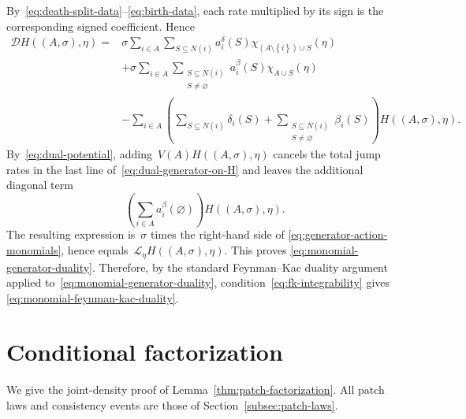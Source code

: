 \documentclass[EJP,preprint,NODS,nobera]{ejpecp}
\newcommand{\bb}[1]{\left(#1\right)}
\newcommand{\cb}[1]{\left\{#1\right\}}
\newcommand{\Lcal}{\mathcal{L}}
\newcommand{\Dcal}{\mathcal{D}}
\begin{document}
By~\eqref{eq:death-split-data}--\eqref{eq:birth-data}, each rate multiplied by
its sign is the corresponding signed coefficient. Hence
\begin{equation}
\label{eq:dual-generator-on-H}
\begin{aligned}
\Dcal H((A,\sigma),\eta)
={}&
\sigma
\sum_{i\in A}\sum_{S\subseteq N(i)}
a_i^\delta(S)
\chi_{\bb{A\setminus\cb{i}}\cup S}(\eta)
\\
&+
\sigma
\sum_{i\in A}
\sum_{\substack{S\subseteq N(i)\\S\neq\varnothing}}
a_i^\beta(S)
\chi_{A\cup S}(\eta)
\\
&-
\sum_{i\in A}
\bb{
\sum_{S\subseteq N(i)}\delta_i(S)
+
\sum_{\substack{S\subseteq N(i)\\S\neq\varnothing}}\beta_i(S)
}H((A,\sigma),\eta).
\end{aligned}
\end{equation}
By~\eqref{eq:dual-potential}, adding~$V(A)H((A,\sigma),\eta)$ cancels the
total jump rates in the last line of~\eqref{eq:dual-generator-on-H} and leaves
the additional diagonal term
\begin{equation*}
\bb{\sum_{i\in A}a_i^\beta(\varnothing)}H((A,\sigma),\eta).
\end{equation*}
The resulting expression is~$\sigma$ times the right-hand side of
\eqref{eq:generator-action-monomials}, hence equals~$\Lcal_\eta H((A,\sigma),\eta)$. This proves
\eqref{eq:monomial-generator-duality}. Therefore, by the standard Feynman--Kac duality argument applied to~\eqref{eq:monomial-generator-duality}, condition~\eqref{eq:fk-integrability} gives
\eqref{eq:monomial-feynman-kac-duality}.
\fi

\section{\texorpdfstring{Conditional factorization}{Conditional factorization}}
\label{app:conditional-factorization}

{\color{red}
We give the joint-density proof of Lemma~\ref{thm:patch-factorization}. All patch laws and consistency events are those of Section~\ref{subsec:patch-laws}.
}
\end{document}
